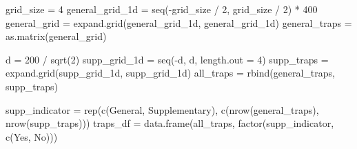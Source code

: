 \documentclass[
]{book}
\newenvironment{Shaded}{\begin{snugshade}}{\end{snugshade}}
\newcommand{\AttributeTok}[1]{\textcolor[rgb]{0.77,0.63,0.00}{#1}}
\newcommand{\DecValTok}[1]{\textcolor[rgb]{0.00,0.00,0.81}{#1}}
\newcommand{\FunctionTok}[1]{\textcolor[rgb]{0.00,0.00,0.00}{#1}}
\newcommand{\NormalTok}[1]{#1}
\newcommand{\OtherTok}[1]{\textcolor[rgb]{0.56,0.35,0.01}{#1}}
\newcommand{\SpecialCharTok}[1]{\textcolor[rgb]{0.00,0.00,0.00}{#1}}
\newcommand{\StringTok}[1]{\textcolor[rgb]{0.31,0.60,0.02}{#1}}
\begin{document}
\begin{Shaded}
\begin{Highlighting}[]
\NormalTok{grid\_size }\OtherTok{=} \DecValTok{4}
\NormalTok{general\_grid\_1d }\OtherTok{=} \FunctionTok{seq}\NormalTok{(}\SpecialCharTok{{-}}\NormalTok{grid\_size }\SpecialCharTok{/} \DecValTok{2}\NormalTok{, grid\_size }\SpecialCharTok{/} \DecValTok{2}\NormalTok{) }\SpecialCharTok{*} \DecValTok{400}
\NormalTok{general\_grid }\OtherTok{=} \FunctionTok{expand.grid}\NormalTok{(general\_grid\_1d, general\_grid\_1d)}
\NormalTok{general\_traps }\OtherTok{=} \FunctionTok{as.matrix}\NormalTok{(general\_grid)}

\NormalTok{d }\OtherTok{=} \DecValTok{200} \SpecialCharTok{/} \FunctionTok{sqrt}\NormalTok{(}\DecValTok{2}\NormalTok{)}
\NormalTok{supp\_grid\_1d }\OtherTok{=} \FunctionTok{seq}\NormalTok{(}\SpecialCharTok{{-}}\NormalTok{d, d, }\AttributeTok{length.out =} \DecValTok{4}\NormalTok{)}
\NormalTok{supp\_traps }\OtherTok{=} \FunctionTok{expand.grid}\NormalTok{(supp\_grid\_1d, supp\_grid\_1d)}
\NormalTok{all\_traps }\OtherTok{=} \FunctionTok{rbind}\NormalTok{(general\_traps, supp\_traps)}

\NormalTok{supp\_indicator }\OtherTok{=} \FunctionTok{rep}\NormalTok{(}\FunctionTok{c}\NormalTok{(}\StringTok{\textquotesingle{}General\textquotesingle{}}\NormalTok{, }\StringTok{\textquotesingle{}Supplementary\textquotesingle{}}\NormalTok{), }\FunctionTok{c}\NormalTok{(}\FunctionTok{nrow}\NormalTok{(general\_traps), }\FunctionTok{nrow}\NormalTok{(supp\_traps)))}
\NormalTok{traps\_df }\OtherTok{=} \FunctionTok{data.frame}\NormalTok{(all\_traps, }\FunctionTok{factor}\NormalTok{(supp\_indicator, }\FunctionTok{c}\NormalTok{(}\StringTok{\textquotesingle{}Yes\textquotesingle{}}\NormalTok{, }\StringTok{\textquotesingle{}No\textquotesingle{}}\NormalTok{)))}


\end{Highlighting}
\end{Shaded}
\end{document}
